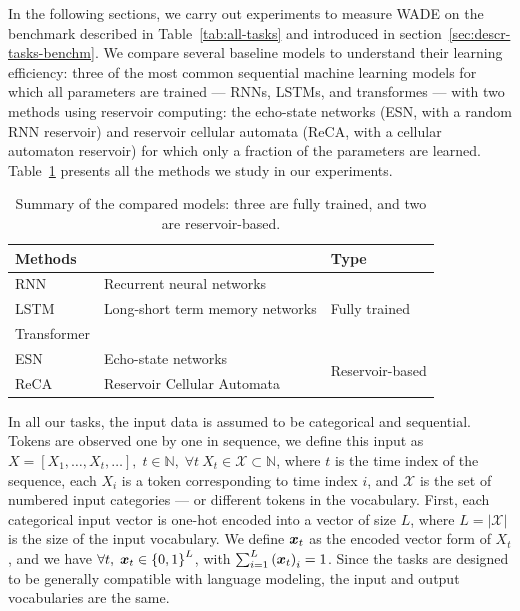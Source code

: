 In the following sections, we carry out experiments to measure \acf{WADE} on
the benchmark described in Table~\ref{tab:all-tasks} and introduced in section~\ref{sec:descr-tasks-benchm}. We compare several
baseline models to understand their learning efficiency: three of the most common
sequential machine learning models for which all parameters are trained --- RNNs, LSTMs, and transformes --- with two methods using reservoir computing: the echo-state networks
(ESN, with a random RNN reservoir) and reservoir cellular automata (ReCA, with a
cellular automaton reservoir) for which only a fraction of the parameters are
learned. Table~\ref{tab:methods-summary} presents all the methods we study in
our experiments.
\begin{table}[h]
  \centering
  \begin{tabular}{lll}
    \toprule
    \multicolumn{2}{l}{\bfseries Methods} & \bfseries Type \\
    \midrule
   RNN & Recurrent neural networks  & \multirow{3}{*}{Fully trained}\\
   LSTM & Long-short term memory networks  & \\
   Transformer &  & \\
    \midrule
   ESN & Echo-state networks  & \multirow{2}{*}{Reservoir-based}\\
   ReCA & Reservoir Cellular Automata  & \\
    \bottomrule
  \end{tabular}
  \caption{Summary of the compared models: three are fully trained, and two are
    reservoir-based.}
\label{tab:methods-summary}
\end{table}

In all our tasks, the input data is assumed to be categorical and sequential.
Tokens are observed one by one in sequence, we define this input as
$X = [X_{1}, \ldots, X_{t}, \ldots],\; t\in \mathbb{N}, \; \forall t \ X_{t} \in \mathcal{X} \subset \mathbb{N}$, where $t$ is the
time index of the sequence, each $X_{i}$ is a token corresponding to time index
$i$, and $\mathcal{X}$ is the set of numbered input categories --- or different tokens in the
vocabulary. First, each categorical input vector is one-hot encoded into a
vector of size $L$, where $L = |\mathcal{X}|$ is the size of the input vocabulary. We define
${\bm{x}}_{t}$ as the encoded vector form of $X_{t}$, and we have
$\forall t,\; {\bm{x}}_{t} \in {\{0, 1\}}^{L}$, with $\sum_{i = 1}^{L}{({\bm{x}}_{t})}_{i} = 1$.
Since the tasks are designed to be generally compatible with language modeling,
the input and output vocabularies are the same.

